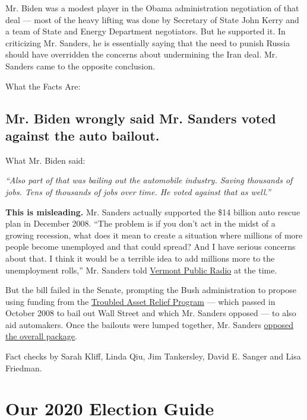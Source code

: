Mr. Biden was a modest player in the Obama administration negotiation of
that deal --- most of the heavy lifting was done by Secretary of State
John Kerry and a team of State and Energy Department negotiators. But he
supported it. In criticizing Mr. Sanders, he is essentially saying that
the need to punish Russia should have overridden the concerns about
undermining the Iran deal. Mr. Sanders came to the opposite conclusion.

What the Facts Are:

\hypertarget{mr-biden-wrongly-said-mr-sanders-voted-against-the-auto-bailout}{%
\subsection{Mr. Biden wrongly said Mr. Sanders voted against the auto
bailout.}\label{mr-biden-wrongly-said-mr-sanders-voted-against-the-auto-bailout}}

What Mr. Biden said:

\emph{``Also part of that was bailing out the automobile industry.
Saving thousands of jobs. Tens of thousands of jobs over time. He voted
against that as well.''}

\textbf{This is misleading.} Mr. Sanders actually supported the \$14
billion auto rescue plan in December 2008. ``The problem is if you don't
act in the midst of a growing recession, what does it mean to create a
situation where millions of more people become unemployed and that could
spread? And I have serious concerns about that. I think it would be a
terrible idea to add millions more to the unemployment rolls,'' Mr.
Sanders told
\href{https://archive.vpr.org/vpr-news/leahy-sanders-reluctantly-support-auto-industry-rescue/}{Vermont
Public Radio} at the time.

But the bill failed in the Senate, prompting the Bush administration to
propose using funding from the
\href{https://www.treasury.gov/initiatives/financial-stability/reports/Pages/TARP-Tracker.aspx}{Troubled
Asset Relief Program} --- which passed in October 2008 to bail out Wall
Street and which Mr. Sanders opposed --- to also aid automakers. Once
the bailouts were lumped together, Mr. Sanders
\href{https://www.senate.gov/legislative/LIS/roll_call_lists/roll_call_vote_cfm.cfm?congress=111\&session=1\&vote=00005}{opposed
the overall package}.

Fact checks by Sarah Kliff, Linda Qiu, Jim Tankersley, David E. Sanger
and Lisa Friedman.

\hypertarget{our-2020-election-guide}{%
\section{Our 2020 Election Guide}\label{our-2020-election-guide}}

